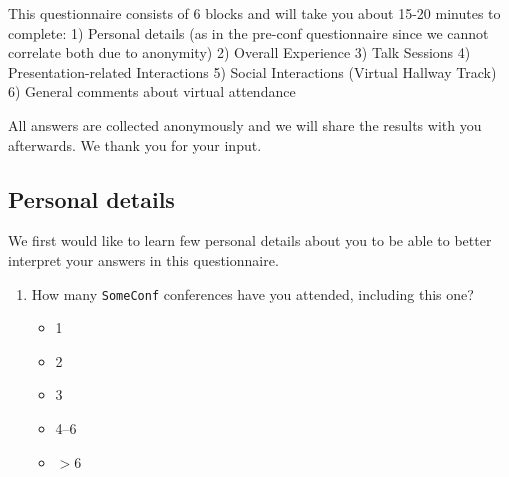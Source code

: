 \documentclass[sigconf]{acmart}
\newcommand{\confname}[0]{\texttt{SomeConf}\xspace}
\newcommand{\QO}{$\Box$}%
\newenvironment{Qlist}{%
\renewcommand{\labelitemi}{\QO}
\begin{itemize}[leftmargin=1.5em,topsep=-.5em]
}{%
\end{itemize}
}
\begin{document}
\begin{appendix}
This questionnaire consists of 6 blocks and will take you about 15-20 minutes to complete: 1) Personal details (as in the pre-conf questionnaire since we cannot correlate both due to anonymity)
2) Overall Experience
3) Talk Sessions
4) Presentation-related Interactions
5) Social Interactions (Virtual Hallway Track)
6) General comments about virtual attendance

All answers are collected anonymously and we will share the results with you afterwards. We thank you for your input.

\subsection{Personal details}
We first would like to learn few personal details about you to be able to better interpret your answers in this questionnaire.

\begin{enumerate}

	\item How many \confname conferences have you attended, including this one?
		\begin{Qlist}
			\item 1
			\item 2
			\item 3
			\item 4--6
			\item $>6$
		\end{Qlist}


\end{enumerate}
\end{appendix}
\end{document}
